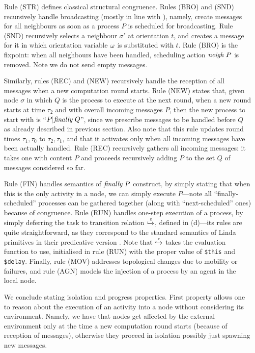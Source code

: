 \documentclass[12pt,a4paper,twoside,openright]{book}
\begin{document}
Rule (STR) defines classical structural congruence.
%
Rules (BRO) and (SND) recursively handle broadcasting (mostly in line with \cite{wsnpa}), namely, create messages for all neighbours as soon as a process $P$ is scheduled for broadcasting.
%
Rule (SND) recursively selects a neighbour $\sigma'$ at orientation $t$, and creates a message for it in which orientation variable $\omega$ is substituted with $t$.
%
Rule (BRO) is the fixpoint: when all neighbours have been handled, scheduling action $\textit{neigh}~P$ is removed. Note we do not send empty messages.

Similarly, rules (REC) and (NEW) recursively handle the reception of all messages when a new computation round starts.
%
Rule (NEW) states that, given node $\sigma$ in which $Q$ is the process to execute at the next round, when a new round starts at time $\tau_2$ and with overall incoming messages $P$, then the new process to start with is ``$P|\textit{finally}~Q$'', since we prescribe messages to be handled before $Q$ as already described in previous section.
%
Also note that this rule updates round times $\tau_1,\tau_0$ to $\tau_2,\tau_1$,  and that it activates only when all incoming messages have been actually handled.
%
Rule (REC) recursively gathers all incoming messages: it takes one with content $P$ and proceeds recursively adding $P$ to the set $Q$ of messages considered so far.

Rule (FIN) handles semantics of $\textit{finally}~P$ construct, by simply stating that when this is the only activity in a node, we can simply execute $P$---note all ``finally-scheduled'' processes can be gathered together (along with ``next-scheduled'' ones) because of congruence. 
%
Rule (RUN) handles one-step execution of a process, by simply deferring the task to transition relation $\xhookrightarrow{\epsilon}$, defined in  (d)---its rules are quite straightforward, as they correspond to the standard semantics of Linda primitives in their predicative version \cite{zavattaro}.
%
Note that $\xhookrightarrow{\epsilon}$ takes the evaluation function to use, initialised in rule (RUN) with the proper value of \texttt{\$this} and \texttt{\$delay}.
%
Finally, rule (MOV) addresses topological changes due to mobility or failures, and rule (AGN) models the injection of a process by an agent in the local node.

We conclude stating isolation and progress properties. 
%
First property allows one to reason about the execution of an activity into a node without considering its environment.
%
Namely, we have that nodes get affected by the external environment only at the time a new computation round starts (because of reception of messages), otherwise they proceed in isolation possibly just spawning new messages.
\end{document}
